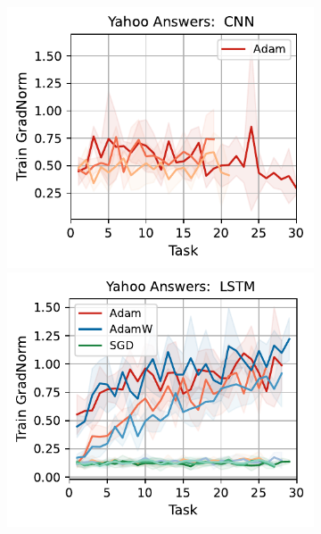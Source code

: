 \begin{figure}[htb!]
{\begin{figure}[htb!]
{        \includegraphics[width=\textwidth]{figs/GradNorm/nlp/cnn/yahoo_answers_50.pdf}
        \includegraphics[width=\textwidth]{figs/GradNorm/nlp/lstm/yahoo_answers_50.pdf}
}
\end{figure}}
\end{figure}
